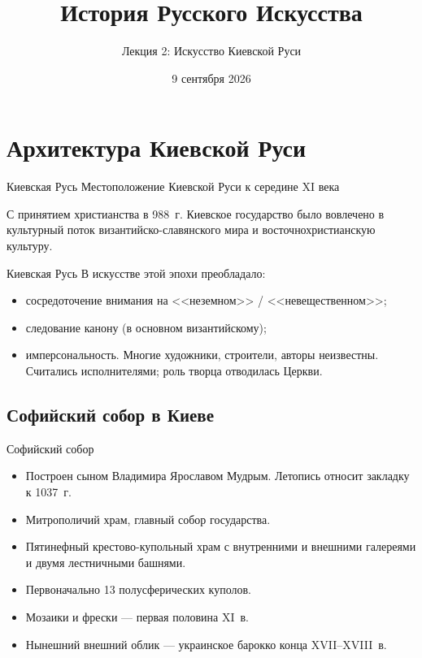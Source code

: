 
{
  \title{История Русского Искусства}
  \subtitle{Лекция 2: Искусство Киевской Руси}
  \date{9 сентября 2026}

  \begin{frame}
    \titlepage
  \end{frame}
}

\section{Архитектура Киевской Руси}

\begin{frame}{Киевская Русь}
    {Местоположение Киевской Руси к середине XI века}

  С принятием христианства в 988~г. Киевское государство было вовлечено
  в культурный поток византийско-славянского мира и восточнохристианскую
  культуру.
\end{frame}

\begin{frame}{Киевская Русь}
    В искусстве этой эпохи преобладало:
    \begin{itemize}
      \item сосредоточение внимания на <<неземном>> / <<невещественном>>;
      \item следование канону (в основном византийскому);
      \item имперсональность. Многие художники, строители, авторы неизвестны.
            Считались исполнителями; роль творца отводилась Церкви.
    \end{itemize}
  \end{frame}

\subsection{Софийский собор в Киеве}

\begin{frame}{Софийский собор}
  \begin{itemize}
    \item Построен сыном Владимира Ярославом Мудрым.
          Летопись относит закладку к 1037~г.
    \item Митрополичий храм, главный собор государства.
    \item Пятинефный крестово-купольный храм с внутренними и внешними
          галереями и двумя лестничными башнями.
    \item Первоначально 13 полусферических куполов.
    \item Мозаики и фрески --- первая половина XI~в. 
    \item Нынешний внешний облик --- украинское барокко конца XVII--XVIII~в.
  \end{itemize}
\end{frame}


